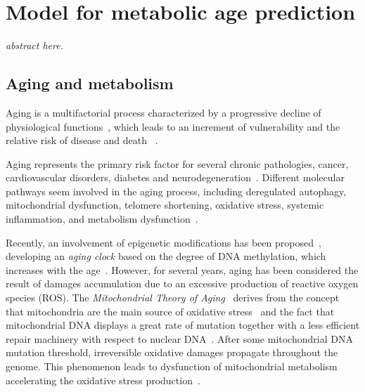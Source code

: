 
\chapter{Model for metabolic age prediction} \label{chap:frassoni}

\begin{displayquote}
	\textit{abstract here.}
\end{displayquote}

\section{Aging and metabolism} \label{sec:frassoni_intro}

Aging is a multifactorial process characterized by a progressive decline of physiological functions~\cite{campisi2013aging}, which leads to an increment of vulnerability and the relative risk of disease and death ~\cite{bratic2010mitochondrial}.

Aging represents the primary risk factor for several chronic pathologies, \ie cancer, cardiovascular disorders, diabetes and neurodegeneration~\cite{lopez2013hallmarks}. Different molecular pathways seem involved in the aging process, including deregulated autophagy, mitochondrial dysfunction, telomere shortening, oxidative stress, systemic inflammation, and metabolism dysfunction~\cite{lopez2013hallmarks, riera2016signaling}.

Recently, an involvement of epigenetic modifications has been proposed~\cite{thompson2017epigenetic}, developing an \textit{aging clock} based on the degree of DNA methylation, which increases with the age~\cite{horvath2013dna}. However, for several years, aging has been considered the result of damages accumulation due to an excessive production of reactive oxygen species (ROS). The \textit{Mitochondrial Theory of Aging}~\cite{harman1972biologic, sastre2000mitochondrial} derives from the  concept that mitochondria are the main source of oxidative stress~\cite{cadenas2000mitochondrial, turrens2003mitochondrial, dai2014mitochondrial} and the fact that mitochondrial DNA displays a
great rate of mutation together with a less efficient repair machinery with respect to nuclear DNA~\cite{short2005decline}. After some mitochondrial DNA mutation threshold, irreversible oxidative damages propagate throughout the genome. This phenomenon leads to dysfunction of mitochondrial metabolism~\cite{genova2004mitochondrial} accelerating the oxidative stress production~\cite{wallace2010mitochondrial}.

